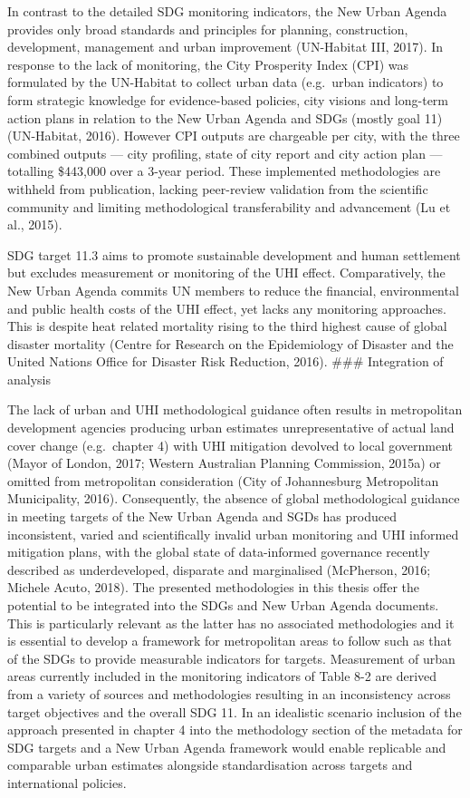\documentclass[]{book}
\begin{document}
In contrast to the detailed SDG monitoring indicators, the New Urban
Agenda provides only broad standards and principles for planning,
construction, development, management and urban improvement (UN-Habitat
III, 2017). In response to the lack of monitoring, the City Prosperity
Index (CPI) was formulated by the UN-Habitat to collect urban data
(e.g.~urban indicators) to form strategic knowledge for evidence-based
policies, city visions and long-term action plans in relation to the New
Urban Agenda and SDGs (mostly goal 11) (UN-Habitat, 2016). However CPI
outputs are chargeable per city, with the three combined outputs ---
city profiling, state of city report and city action plan --- totalling
\$443,000 over a 3-year period. These implemented methodologies are
withheld from publication, lacking peer-review validation from the
scientific community and limiting methodological transferability and
advancement (Lu et al., 2015).

SDG target 11.3 aims to promote sustainable development and human
settlement but excludes measurement or monitoring of the UHI effect.
Comparatively, the New Urban Agenda commits UN members to reduce the
financial, environmental and public health costs of the UHI effect, yet
lacks any monitoring approaches. This is despite heat related mortality
rising to the third highest cause of global disaster mortality (Centre
for Research on the Epidemiology of Disaster and the United Nations
Office for Disaster Risk Reduction, 2016). \#\#\# Integration of
analysis

The lack of urban and UHI methodological guidance often results in
metropolitan development agencies producing urban estimates
unrepresentative of actual land cover change (e.g.~chapter 4) with UHI
mitigation devolved to local government (Mayor of London, 2017; Western
Australian Planning Commission, 2015a) or omitted from metropolitan
consideration (City of Johannesburg Metropolitan Municipality, 2016).
Consequently, the absence of global methodological guidance in meeting
targets of the New Urban Agenda and SGDs has produced inconsistent,
varied and scientifically invalid urban monitoring and UHI informed
mitigation plans, with the global state of data-informed governance
recently described as underdeveloped, disparate and marginalised
(McPherson, 2016; Michele Acuto, 2018). The presented methodologies in
this thesis offer the potential to be integrated into the SDGs and New
Urban Agenda documents. This is particularly relevant as the latter has
no associated methodologies and it is essential to develop a framework
for metropolitan areas to follow such as that of the SDGs to provide
measurable indicators for targets. Measurement of urban areas currently
included in the monitoring indicators of Table 8-2 are derived from a
variety of sources and methodologies resulting in an inconsistency
across target objectives and the overall SDG 11. In an idealistic
scenario inclusion of the approach presented in chapter 4 into the
methodology section of the metadata for SDG targets and a New Urban
Agenda framework would enable replicable and comparable urban estimates
alongside standardisation across targets and international policies.
\end{document}
